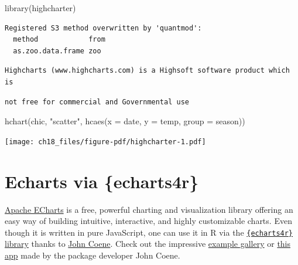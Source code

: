 \documentclass[
  letterpaper,
  DIV=11,
  numbers=noendperiod]{scrreprt}
\newenvironment{Shaded}{\begin{snugshade}}{\end{snugshade}}
\newcommand{\AttributeTok}[1]{\textcolor[rgb]{0.40,0.45,0.13}{#1}}
\newcommand{\FunctionTok}[1]{\textcolor[rgb]{0.28,0.35,0.67}{#1}}
\newcommand{\NormalTok}[1]{\textcolor[rgb]{0.00,0.23,0.31}{#1}}
\newcommand{\StringTok}[1]{\textcolor[rgb]{0.13,0.47,0.30}{#1}}
\begin{document}
\begin{Shaded}
\begin{Highlighting}[]
\FunctionTok{library}\NormalTok{(highcharter)}
\end{Highlighting}
\end{Shaded}

\begin{verbatim}
Registered S3 method overwritten by 'quantmod':
  method            from
  as.zoo.data.frame zoo 
\end{verbatim}

\begin{verbatim}
Highcharts (www.highcharts.com) is a Highsoft software product which is
\end{verbatim}

\begin{verbatim}
not free for commercial and Governmental use
\end{verbatim}

\begin{Shaded}
\begin{Highlighting}[]
\FunctionTok{hchart}\NormalTok{(chic, }\StringTok{"scatter"}\NormalTok{, }\FunctionTok{hcaes}\NormalTok{(}\AttributeTok{x =}\NormalTok{ date, }\AttributeTok{y =}\NormalTok{ temp, }\AttributeTok{group =}\NormalTok{ season))}
\end{Highlighting}
\end{Shaded}

\texttt{[image: ch18\_files/figure-pdf/highcharter-1.pdf]}

\section{Echarts via \{echarts4r\}}\label{echarts-via-echarts4r}

\href{https://echarts.apache.org/en/index.html}{Apache ECharts} is a
free, powerful charting and visualization library offering an easy way
of building intuitive, interactive, and highly customizable charts. Even
though it is written in pure JavaScript, one can use it in R via the
\href{https://echarts4r.john-coene.com/}{\texttt{\{echarts4r\}} library}
thanks to \href{https://john-coene.com/}{John Coene}. Check out the
impressive
\href{https://echarts4r.john-coene.com/articles/chart_types.html}{example
gallery} or \href{https://johncoene.shinyapps.io/fopi-contest/}{this
app} made by the package developer John Coene.
\end{document}
